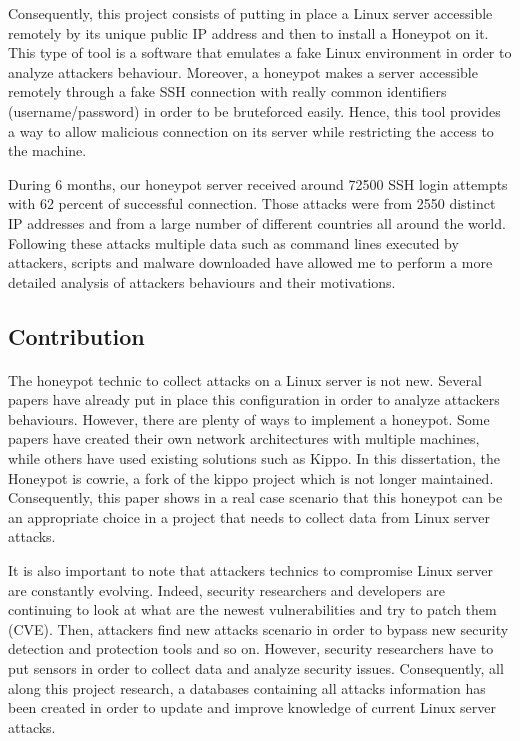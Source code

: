 Consequently, this project consists of putting in place a Linux server accessible remotely 
by its unique public IP address and then to install a Honeypot on it. This type of tool is
a software that emulates a fake Linux environment in order to analyze attackers behaviour.
Moreover, a honeypot makes a server accessible remotely through a fake SSH connection with
 really common identifiers (username/password) in order to be bruteforced easily.
Hence, this tool provides a way to allow malicious connection on its server while restricting
the access to the machine.

During 6 months, our honeypot server received around 72500 SSH login attempts with 62 percent 
of successful connection. Those attacks were from 2550 distinct IP addresses and from a large
number of different countries all around the world. Following these attacks multiple data 
such as command lines executed by attackers, scripts and malware downloaded have allowed 
me to perform a more detailed analysis of attackers behaviours and their motivations.
 
\subsection{Contribution} %

\paragraph{}

The honeypot technic to collect attacks on a Linux server is not new. Several papers have
already put in place this configuration in order to analyze attackers behaviours. However, 
there are plenty of ways to implement a honeypot. Some papers have created their own network
 architectures with multiple machines, while others have used existing solutions such as Kippo.
In this dissertation, the Honeypot is cowrie, a fork of the kippo project which is not longer
maintained. Consequently, this paper shows in a real case scenario that this honeypot can be
 an appropriate choice in a project that needs to collect data from Linux server attacks.
 
It is also important to note that attackers technics to compromise Linux server are constantly 
evolving. Indeed, security researchers and developers are continuing to look at what are the 
newest vulnerabilities and try to patch them (CVE). Then, attackers find new attacks scenario
in order to bypass new security detection and protection tools and so on.
However, security researchers have to put sensors in order to collect data and analyze security
issues. Consequently, all along this project research, a databases containing all attacks information
has been created in order to update and improve knowledge of current Linux server attacks.

